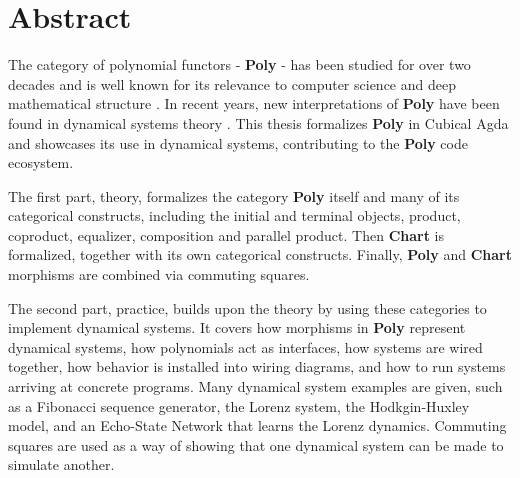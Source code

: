 
\thispagestyle{plain}			%
\section*{Abstract}

The category of polynomial functors - \textbf{Poly} - has been studied for over two decades and is well known for its relevance to computer science \cite{containersPaper} and deep mathematical structure \cite{kockpoly}.
In recent years, new interpretations of \textbf{Poly} have been found in dynamical systems theory \cite{poly-book}. 
This thesis formalizes \textbf{Poly} in Cubical Agda and showcases its use in dynamical systems, contributing to the \textbf{Poly} code ecosystem.

The first part, theory, formalizes the category \textbf{Poly} itself and many of its categorical constructs, including the initial and terminal objects, product, coproduct, equalizer, composition and parallel product. %
Then \textbf{Chart} is formalized, together with its own categorical constructs.
Finally, \textbf{Poly} and \textbf{Chart} morphisms are combined via commuting squares.   %

The second part, practice, builds upon the theory by using these categories to implement dynamical systems.
It covers how morphisms in \textbf{Poly} represent dynamical systems, how polynomials act as interfaces, how
systems are wired together, how behavior is installed into wiring diagrams, and how to run systems arriving at concrete programs.
Many dynamical system examples are given, such as a Fibonacci sequence generator, the Lorenz system, the Hodkgin-Huxley model, and an Echo-State Network that learns the Lorenz dynamics. %
Commuting squares are used as a way of showing that one dynamical system can be made to simulate another.



